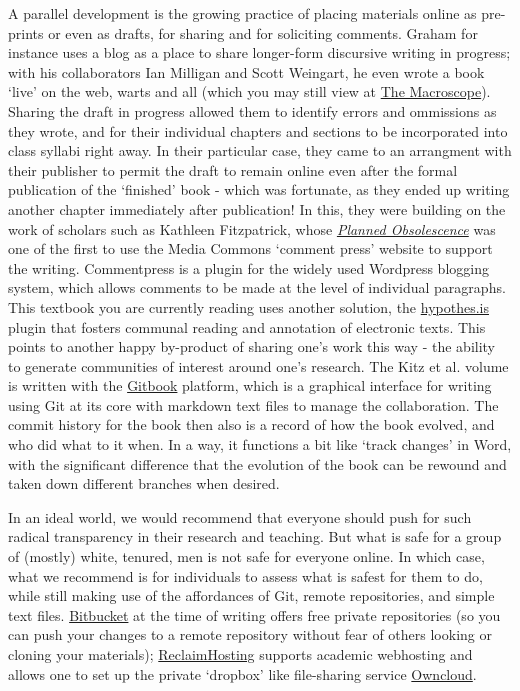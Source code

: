 \documentclass[english,]{book}
\begin{document}
A parallel development is the growing practice of placing materials
online as pre-prints or even as drafts, for sharing and for soliciting
comments. Graham for instance uses a blog as a place to share
longer-form discursive writing in progress; with his collaborators Ian
Milligan and Scott Weingart, he even wrote a book `live' on the web,
warts and all (which you may still view at
\href{http://themacroscope.org}{The Macroscope}). Sharing the draft in
progress allowed them to identify errors and ommissions as they wrote,
and for their individual chapters and sections to be incorporated into
class syllabi right away. In their particular case, they came to an
arrangment with their publisher to permit the draft to remain online
even after the formal publication of the `finished' book - which was
fortunate, as they ended up writing another chapter immediately after
publication! In this, they were building on the work of scholars such as
Kathleen Fitzpatrick, whose
\href{http://mcpress.media-commons.org/plannedobsolescence/}{\emph{Planned
Obsolescence}} was one of the first to use the Media Commons `comment
press' website to support the writing. Commentpress is a plugin for the
widely used Wordpress blogging system, which allows comments to be made
at the level of individual paragraphs. This textbook you are currently
reading uses another solution, the
\href{http://hypothes.is}{hypothes.is} plugin that fosters communal
reading and annotation of electronic texts. This points to another happy
by-product of sharing one's work this way - the ability to generate
communities of interest around one's research. The Kitz et al. volume is
written with the \href{http://gitbook.com}{Gitbook} platform, which is a
graphical interface for writing using Git at its core with markdown text
files to manage the collaboration. The commit history for the book then
also is a record of how the book evolved, and who did what to it when.
In a way, it functions a bit like `track changes' in Word, with the
significant difference that the evolution of the book can be rewound and
taken down different branches when desired.

In an ideal world, we would recommend that everyone should push for such
radical transparency in their research and teaching. But what is safe
for a group of (mostly) white, tenured, men is not safe for everyone
online. In which case, what we recommend is for individuals to assess
what is safest for them to do, while still making use of the affordances
of Git, remote repositories, and simple text files.
\href{http://bitbucket.org}{Bitbucket} at the time of writing offers
free private repositories (so you can push your changes to a remote
repository without fear of others looking or cloning your materials);
\href{http://reclaimhosting.com}{ReclaimHosting} supports academic
webhosting and allows one to set up the private `dropbox' like
file-sharing service \href{https://owncloud.org/}{Owncloud}.
\end{document}
